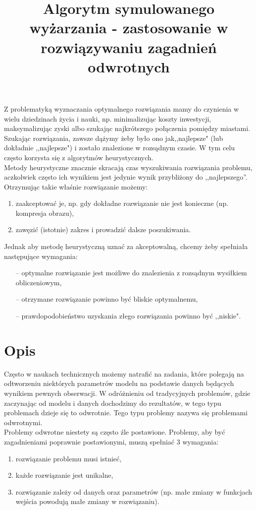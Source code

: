 \documentclass[twoside]{projektInzynierskiMS1}
\title{Algorytm symulowanego wyżarzania - zastosowanie w rozwiązywaniu zagadnień odwrotnych}
\newcommand{\si}{ś}
\begin{document}
Z problematyką wyznaczania optymalnego rozwiązania mamy do czynienia w wielu dziedzinach życia i nauki, np. minimalizując koszty inwestycji, maksymalizując zyski albo szukając najkrótszego połączenia pomiędzy miastami. Szukając rozwiązania, zawsze dążymy żeby było ono jak,,najlepsze" (lub dokładnie ,,najlepsze") i zostało znalezione w rozsądnym czasie. W tym celu często korzysta się z algorytmów heurystycznych. \\ 


Metody heurystyczne znacznie skracają czas wyszukiwania rozwiązania problemu, aczkolwiek często ich wynikiem jest jedynie wynik przybliżony do ,,najlepszego''.  Otrzymując takie wła\si nie rozwiązanie możemy:

\begin{enumerate}
	\item zaakceptować je, np. gdy dokładne rozwiązanie nie jest konieczne (np. kompresja obrazu),
	\item zawęzić (istotnie) zakres i prowadzić dalsze poszukiwania. \\
\end{enumerate}
Jednak aby metodę heurystyczną uznać za akceptowalną, chcemy żeby spełniała następujące wymagania:
\begin{itemize}
	\item[--] optymalne rozwiązanie jest możliwe do znalezienia z rozsądnym wysiłkiem obliczeniowym,
	\item[--] otrzymane rozwiązanie powinno być bliskie optymalnemu,
	\item[--] prawdopodobieństwo uzyskania złego rozwiązania powinno być ,,niskie".
\end{itemize}

\section{Opis}
Często w naukach technicznych możemy natrafić na zadania, które polegają na odtworzeniu niektórych parametrów modelu na podstawie danych będących wynikiem pewnych obserwacji. W odróżnieniu od tradycyjnych problemów, gdzie zaczynając od modelu i danych dochodzimy do rezultatów, w tego typu problemach dzieje się to odwrotnie. Tego typu problemy nazywa się problemami odwrotnymi. \\

Problemy odwrotne niestety są często źle postawione. Problemy, aby być zagadnieniami poprawnie postawionymi, muszą spełniać 3 wymagania:
\begin{enumerate}
	\item rozwiązanie problemu musi istnieć,
	\item każde rozwiązanie jest unikalne,
	\item rozwiązanie zależy od danych oraz parametrów (np. małe zmiany w funkcjach wej\si cia powodują małe zmiany w rozwiązaniu). \\
\end{enumerate}
\end{document}
